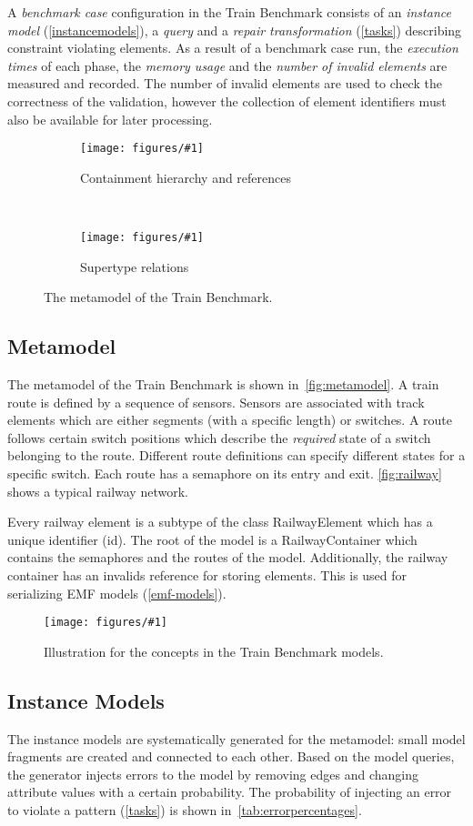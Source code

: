 \documentclass[submission,copyright,creativecommons]{eptcs}
\newcommand{\tb}{Train Benchmark\xspace}
\newcommand{\figref}[1]{\autoref{fig:#1}}
\newcommand{\ttcfig}[2]{
\begin{figure}[htb] 
	\centering
	\texttt{[image: figures/\#1]}
	\caption{#2.}
	\label{fig:#1}
\end{figure}}
\newcommand{\ttcsubfig}[2]{
	\begin{subfigure}[b]{\textwidth}
		\centering
		\texttt{[image: figures/\#1]}
		\caption{#2}
		\label{fig:#1}
	\end{subfigure}
}
\begin{document}
A \emph{benchmark case} configuration in the \tb consists of an \emph{instance model} (\autoref{instancemodels}), a \emph{query} and a \emph{repair transformation} (\autoref{tasks}) describing constraint violating elements. As a result of a benchmark case run, the \emph{execution times} of each phase, the \emph{memory usage} and the \emph{number of invalid elements} are measured and recorded. The number of invalid elements are used to check the correctness of the validation, however the collection of element identifiers must also be available for later processing.

\begin{figure}
	\centering
	\ttcsubfig{railway-containments}{Containment hierarchy and references}
	~
	\ttcsubfig{railway-inheritance}{Supertype relations}
	\caption{The metamodel of the \tb.}
	\label{fig:metamodel}
\end{figure}

\subsection{Metamodel}

The metamodel of the \tb is shown in~\figref{metamodel}. A train \textsf{route} is defined by a sequence of \textsf{sensor}s. Sensors are associated with \textsf{track elements} which are either \textsf{segment}s (with a specific length) or \textsf{switch}es. A route follows certain \textsf{switch positions} which describe the \emph{required} state of a switch belonging to the route. Different route definitions can specify different states for a specific switch. Each route has a \textsf{semaphore} on its entry and exit. \figref{railway} shows a typical railway network.

Every railway element is a subtype of the class \textsf{RailwayElement} which has a unique identifier (\textsf{id}). The root of the model is a \textsf{RailwayContainer} which contains the semaphores and the routes of the model. Additionally, the railway container has an \textsf{invalids} reference for storing elements. This is used for serializing EMF models (\autoref{emf-models}). 

\ttcfig{railway}{Illustration for the concepts in the \tb models}

\subsection{Instance Models}
\label{instancemodels}

The instance models are systematically generated for the metamodel: small model fragments are created and connected to each other. Based on the model queries, the generator injects errors to the model by removing edges and changing attribute values with a certain probability. The probability of injecting an error to violate a pattern (\autoref{tasks}) is shown in~\autoref{tab:errorpercentages}.
\end{document}

